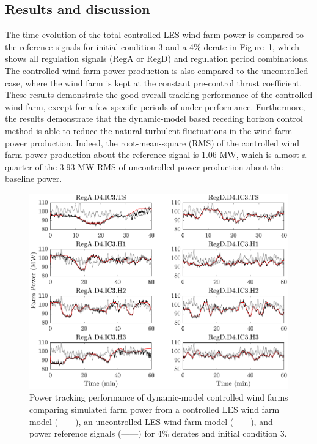 \subsection{Results and discussion}
\label{subsec:rhc-pjm-results}
The time evolution of the total controlled LES wind farm power is compared to the reference signals for initial condition 3 and a 4\% derate in Figure~\ref{fig:pfarm4}, which shows all regulation signals (RegA or RegD) and regulation period combinations. The controlled wind farm power production is also compared to the uncontrolled case, where the wind farm is kept at the constant pre-control thrust coefficient. These results demonstrate the good overall tracking performance of the controlled wind farm, except for a few specific periods of under-performance. Furthermore, the results demonstrate that the dynamic-model based receding horizon control method is able to reduce the natural turbulent fluctuations in the wind farm power production. Indeed, the root-mean-square (RMS) of the controlled wind farm power production about the reference signal is 1.06 MW, which is almost a quarter of the 3.93 MW RMS of uncontrolled power production about the baseline power. 

\begin{figure}[t]
\begin{center}
\includegraphics[width=\textwidth]{./fig/f8.pdf}
\end{center}
\caption{\label{fig:pfarm4}Power tracking performance of dynamic-model controlled wind farms comparing simulated farm power from a controlled LES wind farm model (------), an uncontrolled LES wind farm model ({\color{gray}------}), and power reference signals ({\color{red}------}) for 4\% derates and initial condition 3.}
\end{figure}

